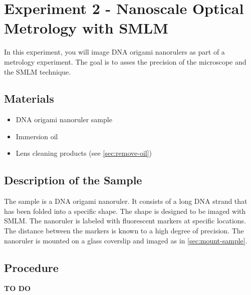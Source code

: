 \documentclass[10pt,a4paper,oneside]{book}
\begin{document}
\section{Experiment 2 - Nanoscale Optical Metrology with SMLM}

In this experiment, you will image DNA origami nanorulers as part of a metrology experiment. The goal is to asses the precision of the microscope and the SMLM technique.

\subsection{Materials}

\begin{itemize}
    \item{DNA origami nanoruler sample}
    \item{Immersion oil}
    \item{Lens cleaning products (see \autoref{sec:remove-oil})}
\end{itemize}

\subsection{Description of the Sample}

The sample is a DNA origami nanoruler. It consists of a long DNA strand that has been folded into a specific shape. The shape is designed to be imaged with SMLM. The nanoruler is labeled with fluorescent markers at specific locations. The distance between the markers is known to a high degree of precision. The nanoruler is mounted on a glass coverslip and imaged as in \autoref{sec:mount-sample}.

\subsection{Procedure}

\textbf{TO DO}
\end{document}
